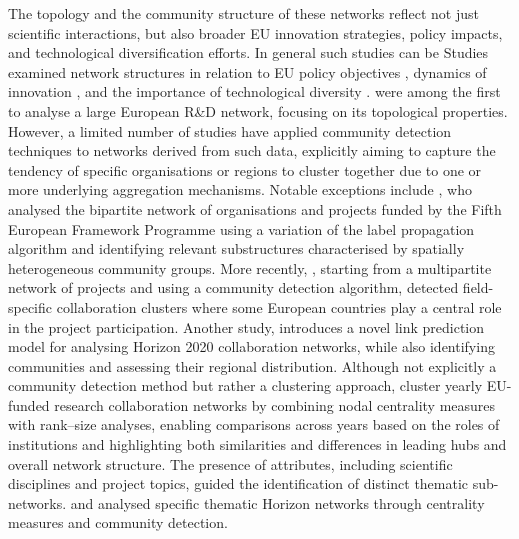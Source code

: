 \documentclass[11pt]{article}
\begin{document}
The topology and the community structure of these networks reflect not just scientific interactions, but also broader EU innovation strategies, policy impacts, and technological diversification efforts. In general such studies can be 
Studies examined network structures in relation to EU policy objectives \citep{Breschi2004UnveilingProgrammes}, dynamics of innovation \citep{Balland2019SmartDiversification, Balland2019Network20032017, Maruccia2020EvidenceHelix}, and the importance of technological diversity \citep{Muscio2022TechnologicalPolicy}. 
\cite{Barber2006NetworkProjects} were among the first to analyse a large European R\&D network, focusing on its topological properties. 
However, a limited number of studies have applied community detection techniques to networks derived from such data, explicitly aiming to capture the tendency of specific organisations or regions to cluster together due to one or more underlying aggregation mechanisms. 
Notable exceptions include \cite{barber2013community}, who analysed the bipartite network of organisations and projects funded by the Fifth European Framework Programme using a variation of the label propagation algorithm and identifying relevant substructures characterised by spatially heterogeneous community groups. 
More recently, \cite{genova2024analytic}, starting from a multipartite network of projects and using a community detection algorithm, detected field-specific collaboration clusters where some European countries play a central role in the project participation. Another study, \citep{KOSZTYAN2024124417} introduces a novel link prediction model for analysing Horizon 2020 collaboration networks, while also identifying communities and assessing their regional distribution. Although not explicitly a community detection method but rather a clustering approach, \cite{cerqueti2024clustering} cluster yearly EU-funded research collaboration networks by combining nodal centrality measures with rank–size analyses, enabling comparisons across years based on the roles of institutions and highlighting both similarities and differences in leading hubs and overall network structure.
The presence of attributes, including scientific disciplines and project topics, guided the identification of distinct thematic sub-networks. \cite{Morea2024MappingAnalysis} and \cite{Morea} analysed specific thematic Horizon networks through centrality measures and community detection.

\end{document}
